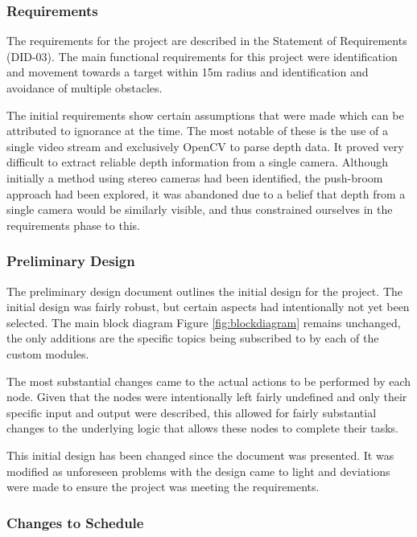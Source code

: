 \documentclass{article}[12]
\begin{document}
		\subsubsection{Requirements}
		
		The requirements for the project are described in the Statement of Requirements (DID-03). \cite{sor} The main functional requirements for this project were identification and movement towards a target within 15m radius and identification and avoidance of multiple obstacles. 
	
		The initial requirements show certain assumptions that were made which can be attributed to ignorance at the time. The most notable of these is the use of a single video stream and exclusively OpenCV to parse depth data. It proved very difficult to extract reliable depth information from a single camera. Although initially a method using stereo cameras had been identified, the push-broom approach \cite{barry2015pushbroom} had been explored, it was abandoned due to a belief that depth from a single camera would be similarly visible, and thus constrained ourselves in the requirements phase to this.

		\subsubsection{Preliminary Design}
		
		The preliminary design document outlines the initial design for the project. \cite{pdd} The initial design was fairly robust, but certain aspects had intentionally not yet been selected. The main block diagram Figure \ref{fig:blockdiagram} remains unchanged, the only additions are the specific topics being subscribed to by each of the custom modules. 
		
		The most substantial changes came to the actual actions to be performed by each node. Given that the nodes were intentionally left fairly undefined and only their specific input and output were described, this allowed for fairly substantial changes to the underlying logic that allows these nodes to complete their tasks.


This initial design has been changed since the document was presented. It was modified as unforeseen problems with the design came to light and deviations were made to ensure the project was meeting the requirements.


		\subsubsection{Changes to Schedule}
	
\end{document}
